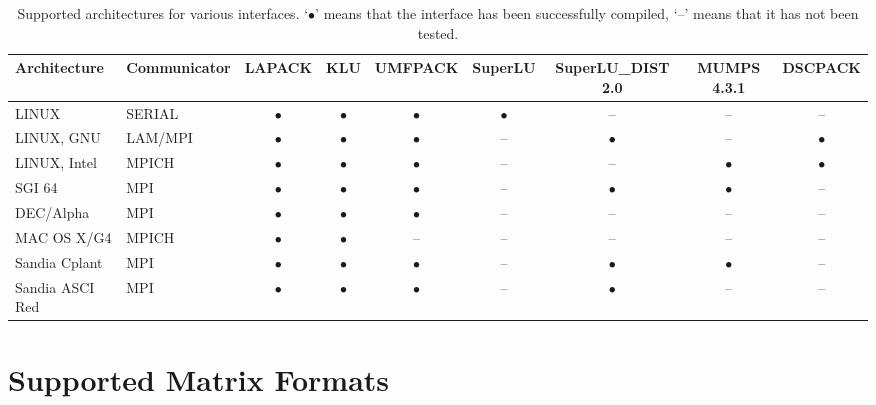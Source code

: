 \documentclass[11pt]{SANDreport}
\begin{document}
\begin{sidewaystable}[tbhp]
  \centering
  \begin{tabular}{| l  l | c | c | c | c | c | c| c|}
    \hline
    Architecture & Communicator & LAPACK  & KLU       & UMFPACK   & SuperLU &  SuperLU\_DIST 2.0
                                                                                          & MUMPS 4.3.1 & DSCPACK\\
    \hline
    LINUX           & SERIAL  & $\bullet$ & $\bullet$ & $\bullet$ & $\bullet$ & --        & --        & --        \\
    LINUX, GNU      & LAM/MPI & $\bullet$ & $\bullet$ & $\bullet$ & --        & $\bullet$ & --        & $\bullet$ \\
    LINUX, Intel    & MPICH   & $\bullet$ & $\bullet$ & $\bullet$ & --        & --        & $\bullet$ & $\bullet$ \\
    SGI 64          & MPI     & $\bullet$ & $\bullet$ & $\bullet$ & --        & $\bullet$ & $\bullet$ & --        \\
    DEC/Alpha       & MPI     & $\bullet$ & $\bullet$ & $\bullet$ & --        & --        & --        & --        \\
    MAC OS X/G4     & MPICH   & $\bullet$ & $\bullet$   & --      & --        & --        & --        & --        \\
    Sandia Cplant   & MPI     & $\bullet$ & $\bullet$ & $\bullet$ & --        & $\bullet$ & $\bullet$ & --        \\
    Sandia ASCI Red & MPI     & $\bullet$ & $\bullet$ & $\bullet$ & --        & $\bullet$ & --        & --        \\
    \hline
  \end{tabular}
  \caption{Supported architectures for various interfaces. 
  `$\bullet$' means that the interface has been successfully compiled, 
  `--' means that it has not been tested.}
  \label{tab:arch}
\end{sidewaystable}

\section{Supported Matrix Formats}
\label{sec:matrix}
\end{document}

